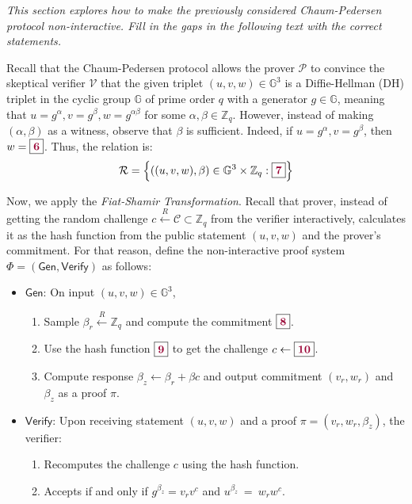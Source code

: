 \documentclass[../lecture-notes.tex]{subfiles}
\begin{document}
    \textit{This section explores how to make the previously considered Chaum-Pedersen protocol non-interactive. Fill in the gaps in the following text with the correct statements.}

    Recall that the Chaum-Pedersen protocol allows the prover $\mathcal{P}$ to convince the skeptical verifier $\mathcal{V}$ that the given triplet $(u,v,w) \in \mathbb{G}^3$ is a Diffie-Hellman (DH) triplet in the cyclic group $\mathbb{G}$ of prime order $q$ with a generator $g \in \mathbb{G}$, meaning that $u=g^{\alpha},v=g^{\beta},w=g^{\alpha\beta}$ for some $\alpha,\beta \in \mathbb{Z}_q$. However, instead of making $(\alpha,\beta)$ as a witness, observe that $\beta$ is sufficient. Indeed, if $u=g^{\alpha},v=g^{\beta}$, then $w=\boxed{\textcolor{purple!80!black}{\textbf{6}}}$. Thus, the relation is:
    \vspace{-2mm}
    \begin{equation*}
        \mathcal{R} = \left\{ ((u,v,w), \beta) \in \mathbb{G}^3 \times \mathbb{Z}_q: \boxed{\textcolor{purple!80!black}{\textbf{7}}} \right\}
    \end{equation*}
    \vspace{-4mm}

    Now, we apply the \textit{Fiat-Shamir Transformation}. Recall that prover, instead of getting the random challenge $c \xleftarrow{R} \mathcal{C} \subset \mathbb{Z}_q$ from the verifier interactively, calculates it as the hash function from the public statement $(u,v,w)$ and the prover's commitment. For that reason, define the non-interactive proof system $\Phi = (\mathsf{Gen}, \mathsf{Verify})$ as follows:
    \begin{itemize}[left=0mm]
        \item $\mathsf{Gen}$: On input $(u,v,w) \in \mathbb{G}^3$, 
        \begin{enumerate}[left=0mm]
            \item Sample $\beta_r \xleftarrow{R} \mathbb{Z}_q$ and compute the commitment $\boxed{\textcolor{purple!80!black}{\textbf{8}}}$.
            \item Use the hash function $\boxed{\textcolor{purple!80!black}{\textbf{9}}}$ to get the challenge $c \gets \boxed{\textcolor{purple!80!black}{\textbf{10}}}$.
            \item Compute response $\beta_z \gets \beta_r + \beta c$ and output commitment $(v_r,w_r)$ and $\beta_z$ as a proof $\pi$.
        \end{enumerate}
        \item $\mathsf{Verify}$: Upon receiving statement $(u,v,w)$ and a proof $\pi=(v_r,w_r,\beta_z)$, the verifier:
        \begin{enumerate}[left=0mm]
            \item Recomputes the challenge $c$ using the hash function.
            \item Accepts if and only if $g^{\beta_z} = v_r v^c$ and $u^{\beta_z}~=~w_r w^c$.
        \end{enumerate}
    \end{itemize}
\end{document}
